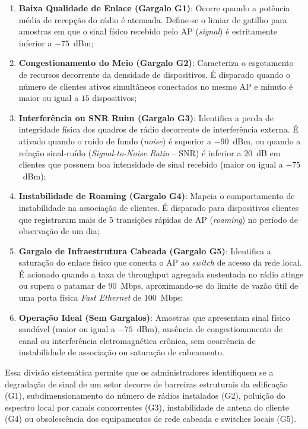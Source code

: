 \begin{enumerate}
	\item \textbf{Baixa Qualidade de Enlace (Gargalo G1)}: Ocorre quando a potência média de recepção do rádio é atenuada. Define-se o limiar de gatilho para amostras em que o sinal físico recebido pelo AP (\textit{signal}) é estritamente inferior a $-75$~dBm;
	\item \textbf{Congestionamento do Meio (Gargalo G2)}: Caracteriza o esgotamento de recursos decorrente da densidade de dispositivos. É disparado quando o número de clientes ativos simultâneos conectados no mesmo AP e minuto é maior ou igual a $15$ dispositivos;
	\item \textbf{Interferência ou SNR Ruim (Gargalo G3)}: Identifica a perda de integridade física dos quadros de rádio decorrente de interferência externa. É ativado quando o ruído de fundo (\textit{noise}) é superior a $-90$~dBm, ou quando a relação sinal-ruído (\textit{Signal-to-Noise Ratio} -- SNR) é inferior a $20$~dB em clientes que possuem boa intensidade de sinal recebido (maior ou igual a $-75$~dBm);
	\item \textbf{Instabilidade de Roaming (Gargalo G4)}: Mapeia o comportamento de instabilidade na associação de clientes. É disparado para dispositivos clientes que registraram mais de $5$ transições rápidas de AP (\textit{roaming}) no período de observação de um dia;
	\item \textbf{Gargalo de Infraestrutura Cabeada (Gargalo G5)}: Identifica a saturação do enlace físico que conecta o AP ao \textit{switch} de acesso da rede local. É acionado quando a taxa de throughput agregada sustentada no rádio atinge ou supera o patamar de $90$~Mbps, aproximando-se do limite de vazão útil de uma porta física \textit{Fast Ethernet} de $100$~Mbps;
	\item \textbf{Operação Ideal (Sem Gargalos)}: Amostras que apresentam sinal físico saudável (maior ou igual a $-75$~dBm), ausência de congestionamento de canal ou interferência eletromagnética crônica, sem ocorrência de instabilidade de associação ou saturação de cabeamento.
\end{enumerate}

Essa divisão sistemática permite que os administradores identifiquem se a degradação de sinal de um setor decorre de barreiras estruturais da edificação (G1), subdimensionamento do número de rádios instalados (G2), poluição do espectro local por canais concorrentes (G3), instabilidade de antena do cliente (G4) ou obsolescência dos equipamentos de rede cabeada e switches locais (G5).

